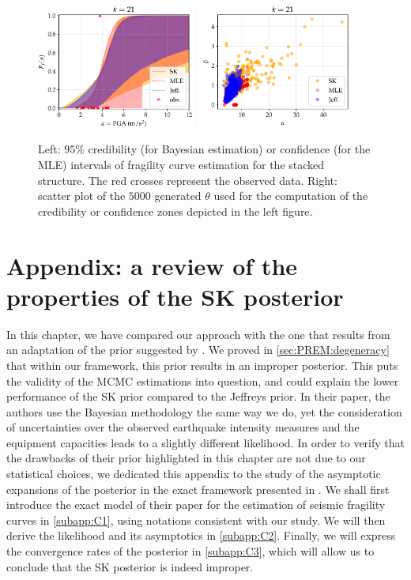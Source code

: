 \begin{figure}[!h]
    \centering
    \includegraphics[width=5.2cm]{figures/PREM/EDEN/PGA21.pdf}\hspace*{0.5cm}
    \includegraphics[width=5.2cm]{figures/PREM/EDEN/PGA21scatter.pdf}
    \caption{Left: $95\%$ credibility (for Bayesian estimation) or confidence (for the MLE) intervals of fragility curve estimation for the stacked structure. The red crosses represent the observed data. Right: scatter plot of the $5000$ generated $\theta$ used for the computation of the credibility or confidence zones depicted in the left figure.}
    \label{fig:PREM:eden-results}
\end{figure}


\section{Appendix: a review of the properties of the SK posterior}\label{app:SKreview}



In this chapter, we have compared our approach with the one that results from an adaptation of the prior suggested by \citet{straub_improved_2008}. We proved in \cref{sec:PREM:degeneracy} that within our framework, this prior results in an improper posterior. This puts the validity of the MCMC estimations into question, and could explain the lower performance of the SK prior compared to the Jeffreys prior. 
In their paper, the authors use the Bayesian methodology the same way we do, yet the consideration of uncertainties over the observed earthquake intensity measures and the equipment capacities leads to a slightly different likelihood.
In order to verify that the drawbacks of their prior highlighted in this chapter are not due to our statistical choices, we dedicated this appendix to the study of the asymptotic expansions of the posterior in the exact framework presented in \cite{straub_improved_2008}.
We shall first introduce the exact model of their paper for the estimation of seismic fragility curves in \cref{subapp:C1}, using notations consistent with our study. We will then derive the likelihood and its asymptotics in \cref{subapp:C2}. Finally, we will express the convergence rates of the posterior in \cref{subapp:C3}, which will allow us to conclude that the SK posterior is indeed improper.

